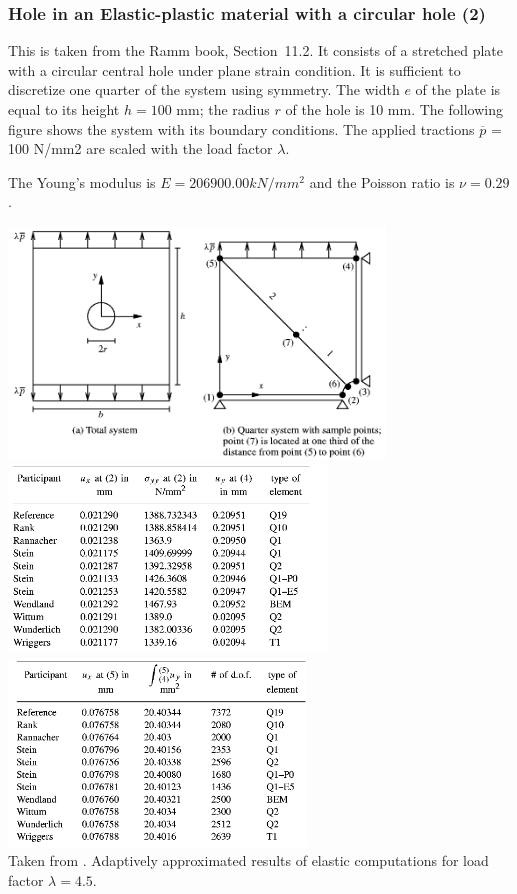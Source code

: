 \subsubsection{Hole in an Elastic-plastic material with a circular hole (2)\label{sec:elastic_hole2}}

This is taken from the Ramm \etal \cite{rarr03} book, Section~11.2.
It consists of a stretched plate with a circular central hole under plane
strain condition. It is sufficient to discretize one quarter of the system using symmetry.
The width $e$ of the plate is equal to its height $h = 100$ mm; the radius $r$ of the hole
is 10 mm. The following figure shows the system with its boundary conditions. The applied
tractions $\overline{p}$ = 100 N/mm2 are scaled with the load factor $\lambda$. 

The Young's modulus is $E=206900.00kN/mm^2$ and the Poisson ratio is $\nu=0.29$.

\begin{center}
\includegraphics[width=10cm]{images/benchmark_rarr03/rarr03a}\\
\includegraphics[height=5cm]{images/benchmark_rarr03/rarr03b}
\includegraphics[height=5cm]{images/benchmark_rarr03/rarr03c}\\
{\captionfont Taken from \cite{rarr03}. Adaptively approximated results of elastic
computations for load factor $\lambda=4.5$.}
\end{center}

